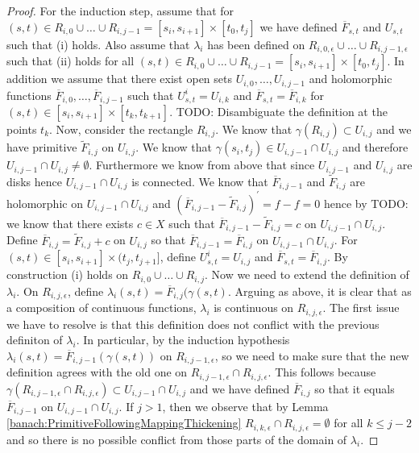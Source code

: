\begin{proof}
  For the induction step, assume that for $(s,t) \in R_{i,0} \cup \dotsc \cup R_{i, j-1} = [s_i, s_{i+1}] \times [t_0, t_j]$ we have defined $\overline{F}_{s,t}$  and $U_{s,t}$ such that (i) holds.  Also assume that $\lambda_i$ has been defined on $R_{i,0,\epsilon} \cup \dotsc \cup R_{i,j-1, \epsilon}$ such that (ii) holds for all $(s,t) \in R_{i,0} \cup \dotsc \cup R_{i, j-1} = [s_i, s_{i+1}] \times [t_0, t_j]$.   In addition we assume that there exist open sets $U_{i,0}, \dots, U_{i, j-1}$ and holomorphic functions $\overline{F}_{i,0}, \dots, \overline{F}_{i, j-1}$ such that $U^i_{s,t} = U_{i,k}$ and $\overline{F}_{s,t} = \overline{F}_{i, k}$ for $(s,t) \in [s_i, s_{i+1}] \times [t_k, t_{k+1}]$.   TODO: Disambiguate the definition at the points $t_k$.   Now, consider the rectangle $R_{i, j}$.  We know that $\gamma(R_{i,j}) \subset U_{i,j}$ and we have primitive $\tilde{F}_{i,j}$ on $U_{i,j}$.   We know that $\gamma(s_i, t_j) \in U_{i,j-1} \cap U_{i,j}$ and therefore $U_{i,j-1} \cap U_{i,j} \neq \emptyset$.   Furthermore we know from above that since $U_{i,j-1}$ and $U_{i,j}$ are disks hence $U_{i,j-1} \cap U_{i,j}$ is connected.   We know that $\overline{F}_{i, j-1}$ and $\tilde{F}_{i,j}$ are holomorphic on $U_{i,j-1} \cap U_{i,j}$ and $\left(\overline{F}_{i, j-1} - \tilde{F}_{i,j}\right)^\prime = f - f = 0$ hence by TODO: we know that there exists $c \in X$ such that $\overline{F}_{i, j-1} - \tilde{F}_{i,j} = c$ on $U_{i,j-1} \cap U_{i,j}$.   Define $\overline{F}_{i,j} = \tilde{F}_{i,j} + c$ on $U_{i,j}$ so that $\overline{F}_{i, j-1} = \overline{F}_{i,j}$ on $U_{i,j-1} \cap U_{i,j}$.   For $(s,t) \in  [s_i, s_{i+1}]  \times (t_j, t_{j+1}]$, define $U^i_{s,t} = U_{i,j}$ and $\overline{F}_{s,t} = \overline{F}_{i,j}$.   By construction (i) holds on $R_{i,0} \cup \dotsc \cup R_{i, j}$.   Now we need to extend the definition of $\lambda_i$.   On $R_{i,j,\epsilon}$, define $\lambda_i(s,t) = \overline{F}_{i,j}(\gamma(s,t)$.   Arguing as above, it is clear that as a composition of continuous functions, $\lambda_i$ is continuous on $R_{i,j,\epsilon}$.   The first issue we have to resolve is that this definition does not conflict with the previous definiton of $\lambda_i$.   In particular, by the induction hypothesis $\lambda_i(s,t) = \overline{F}_{i,j-1}(\gamma(s,t))$ on $R_{i,j-1,\epsilon}$, so we need to make sure that the new definition agrees with the old one on $R_{i,j-1,\epsilon} \cap R_{i,j,\epsilon}$.   This follows because $\gamma(R_{i,j-1,\epsilon}\cap R_{i,j,\epsilon}) \subset U_{i,j-1} \cap U_{i,j}$ and we have defined $\overline{F}_{i,j}$ so that it equals $\overline{F}_{i,j-1}$ on $U_{i,j-1} \cap U_{i,j}$.   If $j>1$, then we observe that by Lemma \ref{banach:PrimitiveFollowingMappingThickening} $R_{i,k,\epsilon}\cap R_{i,j,\epsilon} = \emptyset$ for all $k \leq j-2$ and so there is no possible conflict from those parts of the domain of $\lambda_i$.


\end{proof}
